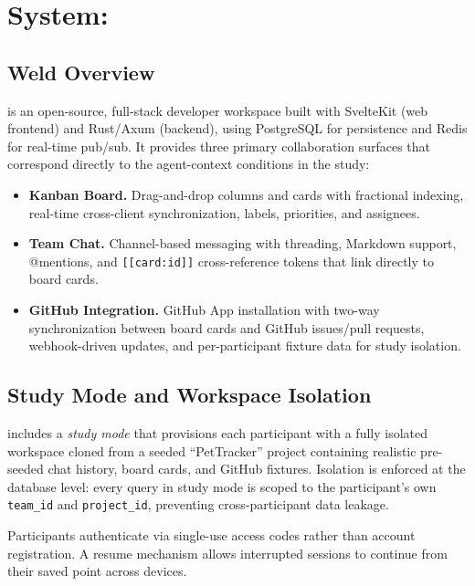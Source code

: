 \section{System: \Weld}
\label{sec:system}

\subsection{Weld Overview}
\label{sec:system:overview}

\Weld is an open-source, full-stack developer workspace built with SvelteKit
(web frontend) and Rust/Axum (backend), using PostgreSQL for persistence and
Redis for real-time pub/sub. It provides three primary collaboration surfaces
that correspond directly to the agent-context conditions in the study:

\begin{itemize}
  \item \textbf{Kanban Board.} Drag-and-drop columns and cards with fractional
    indexing, real-time cross-client synchronization, labels, priorities, and
    assignees.

  \item \textbf{Team Chat.} Channel-based messaging with threading, Markdown
    support, @mentions, and \texttt{[[card:id]]} cross-reference tokens that
    link directly to board cards.

  \item \textbf{GitHub Integration.} GitHub App installation with two-way
    synchronization between board cards and GitHub issues/pull requests,
    webhook-driven updates, and per-participant fixture data for study isolation.
\end{itemize}

\subsection{Study Mode and Workspace Isolation}
\label{sec:system:study}

\Weld includes a \emph{study mode} that provisions each participant with a
fully isolated workspace cloned from a seeded ``PetTracker'' project containing
realistic pre-seeded chat history, board cards, and GitHub fixtures. Isolation
is enforced at the database level: every query in study mode is scoped to the
participant's own \texttt{team\_id} and \texttt{project\_id}, preventing
cross-participant data leakage.

Participants authenticate via single-use access codes rather than account
registration. A resume mechanism allows interrupted sessions to continue from
their saved point across devices.


